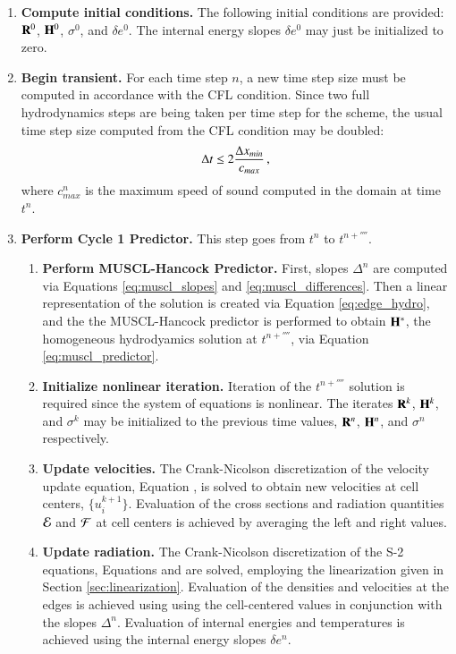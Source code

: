 \begin{enumerate}

\item \textbf{Compute initial conditions.} The following initial conditions
are provided: $\mathbf{R}^0$, $\mathbf{H}^0$, $\sigma^0$, and $\delta e^0$. The internal
energy slopes $\delta e^0$ may just be initialized to zero.

\item \textbf{Begin transient.} For each time step $n$, a new time step
size must be computed in accordance with the CFL condition. Since two
full hydrodynamics steps are being taken per time step for the scheme,
the usual time step size computed from the CFL condition may be doubled:
\begin{equation}
   \Delta t \leq 2\frac{\Delta x_{min}}{c_{max}} \, ,
\end{equation}
where $c_{max}^n$ is the maximum speed of sound computed in the domain
at time $t^n$.


\item \textbf{Perform Cycle 1 Predictor.} This step goes from
$t^n$ to $t^{n+\fourth}$.

\begin{enumerate}
\item \textbf{Perform MUSCL-Hancock Predictor.} First, slopes $\Delta^n$ are
computed via Equations \eqref{eq:muscl_slopes} and \eqref{eq:muscl_differences}.
Then a linear representation of the solution is created via
Equation \eqref{eq:edge_hydro}, and the
the MUSCL-Hancock predictor is performed to obtain $\mathbf{H}^*$, the
homogeneous hydrodyamics solution at $t^{n+\fourth}$,
via Equation \eqref{eq:muscl_predictor}.

\item \textbf{Initialize nonlinear iteration.} Iteration of the
$t^{n+\fourth}$ solution is required since the system of equations
is nonlinear. The iterates $\mathbf{R}^k$, $\mathbf{H}^k$, and $\sigma^k$ may be initialized
to the previous time
values, $\mathbf{R}^n$, $\mathbf{H}^n$, and $\sigma^n$ respectively.

\item\label{item:vel_update}
\textbf{Update velocities.} The Crank-Nicolson discretization
of the velocity update equation, Equation ,
is solved to obtain new
velocities at cell centers, $\{u_i^{k+1}\}$. Evaluation of
the cross sections and radiation quantities $\mathcal{E}$ and $\mathcal{F}$
at cell centers is achieved by averaging the left and right values.

\item \textbf{Update radiation.} The Crank-Nicolson discretization of the S-2
equations, Equations  and  are solved,
employing the linearization given in Section \ref{sec:linearization}.
Evaluation of the densities and velocities at the edges is achieved using using
the cell-centered values in conjunction with the slopes $\Delta^n$. Evaluation
of internal energies and temperatures is achieved using the internal energy
slopes $\delta e^n$.


\end{enumerate}
\end{enumerate}
